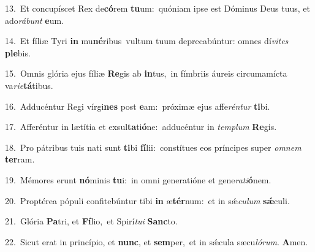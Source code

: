 {\numbfont\textcolor{\numbcolor}{13.}}~Et concupíscet Rex de\-\textbf{có}\-rem \textbf{tu}\-um:~\star quóniam ipse est Dóminus Deus tuus, et ado\-\textit{rá}\-\textit{bunt} \textbf{e}\-um.\par
{\numbfont\textcolor{\numbcolor}{14.}}~Et fíliæ Tyri \textbf{in} mu\-\textbf{né}\-ribus~\star vultum tuum deprecabúntur: omnes dí\-\textit{vi}\-\textit{tes} \textbf{ple}\-bis.\par
{\numbfont\textcolor{\numbcolor}{15.}}~Omnis glória ejus fíliæ \textbf{Re}\-gis ab \textbf{in}\-tus,~\star in fímbriis áureis circumamícta va\-\textit{ri}\-\textit{e}\textbf{tá}tibus.\par
{\numbfont\textcolor{\numbcolor}{16.}}~Adducéntur Regi vírgi\textbf{nes} post \textbf{e}\-am:~\star próximæ ejus affe\-\textit{rén}\-\textit{tur} \textbf{ti}\-bi.\par
{\numbfont\textcolor{\numbcolor}{17.}}~Afferéntur in lætítia et exsul\-\textbf{ta}\-ti\-\textbf{ó}\-ne:~\star adducéntur in \textit{tem}\-\textit{plum} \textbf{Re}\-gis.\par
{\numbfont\textcolor{\numbcolor}{18.}}~Pro pátribus tuis nati sunt \textbf{ti}\-bi \textbf{fí}\-lii:~\star constítues eos príncipes super \textit{om}\-\textit{nem} \textbf{ter}\-ram.\par
{\numbfont\textcolor{\numbcolor}{19.}}~Mémores erunt \textbf{nó}\-minis \textbf{tu}\-i:~\star in omni generatióne et gene\-\textit{ra}\-\textit{ti}\textbf{ó}nem.\par
{\numbfont\textcolor{\numbcolor}{20.}}~Proptérea pópuli confitebúntur tibi \textbf{in} æ\-\textbf{tér}\-num:~\star et in sǽ\-\textit{cu}\-\textit{lum} \textbf{sǽ}\-culi.\par
{\numbfont\textcolor{\numbcolor}{21.}}~Glória \textbf{Pa}\-tri, et \textbf{Fí}\-lio,~\star et Spirí\-\textit{tu}\-\textit{i} \textbf{Sanc}\-to.\par
{\numbfont\textcolor{\numbcolor}{22.}}~Sicut erat in princípio, et \textbf{nunc}\-, et \textbf{sem}\-per,~\star et in sǽcula sæcu\-\textit{ló}\-\textit{rum}. \textbf{A}\-men.\par
